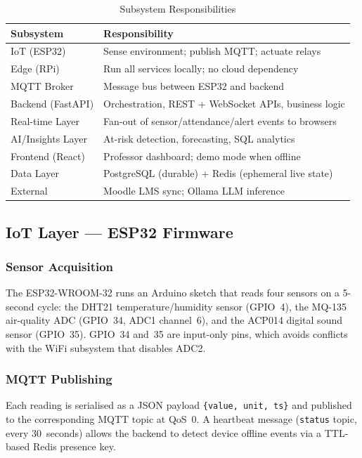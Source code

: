 \begin{table}[H]
\centering
\caption{Subsystem Responsibilities}
\label{tab:subsystems}
\begin{tabular}{@{}p{2.0cm}p{5.5cm}@{}}
\toprule
\textbf{Subsystem} & \textbf{Responsibility} \\
\midrule
IoT (ESP32)        & Sense environment; publish MQTT; actuate relays \\
Edge (RPi)         & Run all services locally; no cloud dependency \\
MQTT Broker        & Message bus between ESP32 and backend \\
Backend (FastAPI)  & Orchestration, REST + WebSocket APIs, business logic \\
Real-time Layer    & Fan-out of sensor/attendance/alert events to browsers \\
AI/Insights Layer  & At-risk detection, forecasting, SQL analytics \\
Frontend (React)   & Professor dashboard; demo mode when offline \\
Data Layer         & PostgreSQL (durable) + Redis (ephemeral live state) \\
External           & Moodle LMS sync; Ollama LLM inference \\
\bottomrule
\end{tabular}
\end{table}

\subsection{IoT Layer — ESP32 Firmware}
\label{subsec:iot_layer}

\subsubsection{Sensor Acquisition}
The ESP32-WROOM-32 runs an Arduino sketch that reads four sensors on a
5-second cycle: the DHT21 temperature/humidity sensor (GPIO~4), the
MQ-135 air-quality ADC (GPIO~34, ADC1 channel~6), and the ACP014
digital sound sensor (GPIO~35).  GPIO~34 and~35 are input-only pins,
which avoids conflicts with the WiFi subsystem that disables ADC2.

\subsubsection{MQTT Publishing}
Each reading is serialised as a JSON payload
\texttt{\{value, unit, ts\}} and published to the corresponding MQTT
topic at QoS~0.  A heartbeat message (\texttt{status} topic, every
30~seconds) allows the backend to detect device offline events via a
TTL-based Redis presence key.

